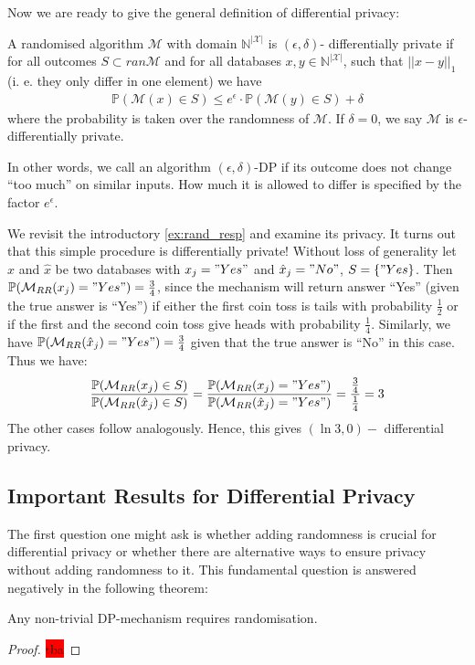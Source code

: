 Now we are ready to give the general definition of differential privacy:
\begin{definition} \label{def:dp}
    A randomised algorithm $\mathcal{M}$ with domain $\mathbb{N}^{|\mathcal{X}|}$ is $(\epsilon, \delta)$- differentially private if for all outcomes $S \subset ran \mathcal{M}$ and for all databases $x,y \in \mathbb{N}^{|\mathcal{X}|}$, such that $||x-y||_1$ (i. e. they only differ in one element) we have
    \begin{align}
        \mathbb{P}(\mathcal{M}(x) \in S) \le e^\epsilon \cdot \mathbb{P}(\mathcal{M}(y) \in S) + \delta 
    \end{align}
    where the probability is taken over the randomness of $\mathcal{M}$. If $\delta=0$, we say $\mathcal{M}$ is $\epsilon$-differentially private.
\end{definition}

In other words, we call an algorithm $(\epsilon, \delta)$-DP if its outcome does not change ``too much'' on similar inputs. How much it is allowed to differ is specified by the factor $e^\epsilon$.


\begin{ex}
    We revisit the introductory \cref{ex:rand_resp} and examine its privacy. It turns out that this simple procedure is differentially private! Without loss of generality let $x$ and $\hat{x}$ be two databases with $x_j="Yes"$ and $\hat{x}_j="No"$, $S = \{"Yes\}$. Then $\mathbb{P}(\mathcal{M}_{RR}(x_j)= "Yes") = \frac{3}{4}$, since the mechanism will return answer ``Yes'' (given the true answer is ``Yes'') if either the first coin toss is tails with probability $\frac{1}{2}$ or if the first and the second coin toss give heads with probability $\frac{1}{4}$. Similarly, we have  $\mathbb{P}(\mathcal{M}_{RR}(\hat{x}_j)= "Yes") = \frac{3}{4}$ given that the true answer is ``No'' in this case. Thus we have:
    \begin{align}
        \frac{\mathbb{P}(\mathcal{M}_{RR}(x_j)\in S)}{\mathbb{P}(\mathcal{M}_{RR}(\hat{x}_j)\in S)} = \frac{\mathbb{P}(\mathcal{M}_{RR}(x_j)= "Yes")}{\mathbb{P}(\mathcal{M}_{RR}(\hat{x}_j)="Yes")} = \frac{\frac{3}{4}}{\frac{1}{4}} = 3
    \end{align} 
    The other cases follow analogously. Hence, this gives $(\ln 3, 0)-$ differential privacy.
\end{ex}

\subsection{Important Results for Differential Privacy}
The first question one might ask is whether adding randomness is crucial for differential privacy or whether there are alternative ways to ensure privacy without adding randomness to it. This fundamental question is answered negatively in the following theorem:
\begin{thm} \label{thm:dp_random}
    Any non-trivial DP-mechanism requires randomisation.
\end{thm}
\begin{proof}
    \colorbox{red}{tba}
\end{proof}

